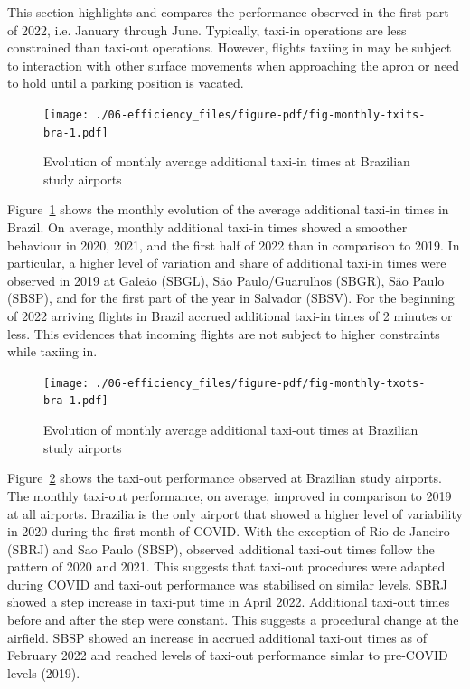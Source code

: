 \documentclass[
  a4paper,
  DIV=11,
  numbers=noendperiod]{scrreprt}
\begin{document}
This section highlights and compares the performance observed in the
first part of 2022, i.e. January through June. Typically, taxi-in
operations are less constrained than taxi-out operations. However,
flights taxiing in may be subject to interaction with other surface
movements when approaching the apron or need to hold until a parking
position is vacated.

\begin{figure}[h]

{\centering \texttt{[image: ./06-efficiency\_files/figure-pdf/fig-monthly-txits-bra-1.pdf]}

}

\caption{\label{fig-monthly-txits-bra}Evolution of monthly average
additional taxi-in times at Brazilian study airports}

\end{figure}

Figure~\ref{fig-monthly-txits-bra} shows the monthly evolution of the
average additional taxi-in times in Brazil. On average, monthly
additional taxi-in times showed a smoother behaviour in 2020, 2021, and
the first half of 2022 than in comparison to 2019. In particular, a
higher level of variation and share of additional taxi-in times were
observed in 2019 at Galeão (SBGL), São Paulo/Guarulhos (SBGR), São Paulo
(SBSP), and for the first part of the year in Salvador (SBSV). For the
beginning of 2022 arriving flights in Brazil accrued additional taxi-in
times of 2 minutes or less. This evidences that incoming flights are not
subject to higher constraints while taxiing in.

\begin{figure}[h]

{\centering \texttt{[image: ./06-efficiency\_files/figure-pdf/fig-monthly-txots-bra-1.pdf]}

}

\caption{\label{fig-monthly-txots-bra}Evolution of monthly average
additional taxi-out times at Brazilian study airports}

\end{figure}

Figure~\ref{fig-monthly-txots-bra} shows the taxi-out performance
observed at Brazilian study airports. The monthly taxi-out performance,
on average, improved in comparison to 2019 at all airports. Brazilia is
the only airport that showed a higher level of variability in 2020
during the first month of COVID. With the exception of Rio de Janeiro
(SBRJ) and Sao Paulo (SBSP), observed additional taxi-out times follow
the pattern of 2020 and 2021. This suggests that taxi-out procedures
were adapted during COVID and taxi-out performance was stabilised on
similar levels. SBRJ showed a step increase in taxi-put time in April
2022. Additional taxi-out times before and after the step were constant.
This suggests a procedural change at the airfield. SBSP showed an
increase in accrued additional taxi-out times as of February 2022 and
reached levels of taxi-out performance simlar to pre-COVID levels
(2019).
\end{document}
